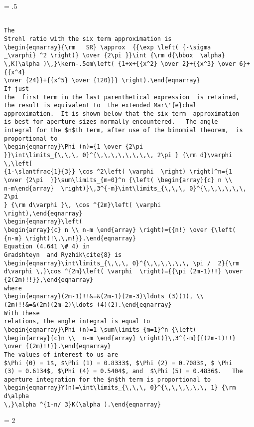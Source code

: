\newpage
\baselineskip = .5\baselineskip  %
\begin{verbatim}

The
Strehl ratio with the six term approximation is
\begin{eqnarray}{\rm   SR} \approx  {{\exp \left( {-\sigma
_\varphi} ^2 \right)} \over {2\pi }}\int {\rm d{\bbox  \alpha}
\,K(\alpha )\,}\kern-.5em\left( {1+x+{{x^2} \over 2}+{{x^3} \over 6}+{{x^4}
\over {24}}+{{x^5} \over {120}}} \right).\end{eqnarray}
If just
the  first term in the last parenthetical expression  is retained,
the result is equivalent to  the extended Mar\'{e}chal
approximation.  It is shown below that the six-term  approximation
is best for aperture sizes normally encountered.   The angle
integral for the $n$th term, after use of the binomial theorem,  is
proportional to
\begin{eqnarray}\Phi (n)={1 \over {2\pi
}}\int\limits_{\,\,\, 0}^{\,\,\,\,\,\,\,\, 2\pi } {\rm d}\varphi \,\left[
{1-\slantfrac{1}{3}} \cos ^2\left( \varphi  \right) \right]^n={1
\over {2\pi  }}\sum\limits_{m=0}^n {\left( \begin{array}{c} n \\
n-m\end{array}  \right)}\,3^{-m}\int\limits_{\,\,\, 0}^{\,\,\,\,\,\, 2\pi
} {\rm d\varphi }\, \cos ^{2m}\left( \varphi
\right),\end{eqnarray}
\begin{eqnarray}\left(
\begin{array}{c} n \\ n-m \end{array} \right)={{n!} \over {\left(
{n-m} \right)!\,\,m!}}.\end{eqnarray}
Equation (4.641 \# 4) in
Gradshteyn  and Ryzhik\cite{8} is
\begin{eqnarray}\int\limits_{\,\,\, 0}^{\,\,\,\,\,\, \pi /  2}{\rm
d\varphi \,}\cos ^{2m}\left( \varphi  \right)={{\pi (2m-1)!!} \over
{2(2m)!!}},\end{eqnarray}
where
\begin{eqnarray}(2m-1)!!&=&(2m-1)(2m-3)\ldots (3)(1), \\
(2m)!!&=&(2m)(2m-2)\ldots (4)(2).\end{eqnarray}
With these
relations, the angle integral is equal to
\begin{eqnarray}\Phi (n)=1-\sum\limits_{m=1}^n {\left(
\begin{array}{c}n \\  n-m \end{array} \right)}\,3^{-m}{{(2m-1)!!}
\over {(2m)!!}}.\end{eqnarray}
The values of interest to us are
$\Phi (0) = 1$, $\Phi (1) = 0.8333$, $\Phi (2) = 0.7083$, $ \Phi
(3) = 0.6134$, $\Phi (4) = 0.5404$, and  $\Phi (5) = 0.4836$.   The
aperture integration for the $n$th term is proportional to
\begin{eqnarray}Y(n)=\int\limits_{\,\,\, 0}^{\,\,\,\,\,\, 1} {\rm d\alpha
\,}\alpha ^{1-n/ 3}K(\alpha ).\end{eqnarray}

\end{verbatim}
\newpage
\baselineskip = 2\baselineskip  %


